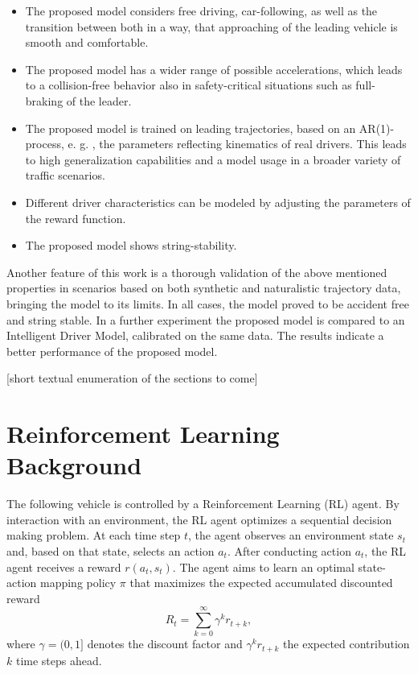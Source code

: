 \documentclass[review]{elsarticle}
\providecommand{\3}{{\ss}}
\begin{document}
\begin{itemize}
	\item  The proposed model considers free driving, car-following, as well as the transition between both in a way, that approaching of the leading vehicle is smooth and comfortable.
	\item The proposed model has a wider range of possible accelerations, which leads to a collision-free behavior also in safety-critical situations such as full-braking of the leader.
	\item The proposed model is trained on leading trajectories, based on an AR(1)-process, e. g. \cite{HonerkampEngl}, the parameters reflecting kinematics of real drivers. This leads to high generalization capabilities and a model usage in a broader variety of traffic scenarios. 
	\item Different driver characteristics can be modeled by adjusting the parameters of the reward function.
	\item The proposed model shows string-stability.
	
\end{itemize}

Another feature of this work is a thorough validation of the above mentioned properties in scenarios based on both synthetic and naturalistic trajectory data, bringing the model to its limits. 
In all cases, the model proved to be accident free and string stable.
In a further experiment the proposed model is compared to an Intelligent Driver Model, calibrated on the same data. The results indicate a better performance of the proposed model.


[short textual enumeration of the sections to come]

\section{Reinforcement Learning Background}
The following vehicle is controlled by a Reinforcement
Learning (RL) agent. By interaction with an environment, the RL agent
optimizes a sequential decision making problem. At each time step
$t$, the agent observes an environment state $s_t$ and, based on that state, selects
an action $a_t$. After conducting action $a_t$, the RL agent receives
a reward $r(a_t,s_t)$. The agent aims to learn an optimal state-action
mapping policy $\pi$ that maximizes the expected accumulated
discounted reward
\begin{equation}
\label{Rt}
R_{t}=\sum_{k=0}^{\infty} \gamma^{k} r_{t+k},
\end{equation}
 where $\gamma = (0,1]$ denotes the discount factor and 
$\gamma^k r_{t+k}$ the expected contribution $k$ time steps ahead. 
\end{document}
